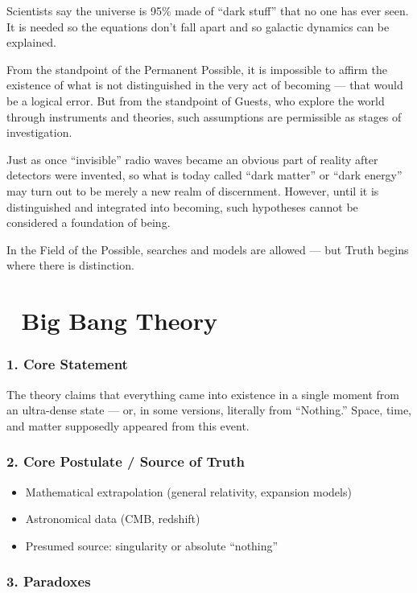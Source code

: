 \documentclass[12pt]{article}
\begin{document}
Scientists say the universe is 95\% made of ``dark stuff'' that no one has ever seen. It is needed so the equations don’t fall apart and so galactic dynamics can be explained.

From the standpoint of the Permanent Possible, it is impossible to affirm the existence of what is not distinguished in the very act of becoming — that would be a logical error. But from the standpoint of Guests, who explore the world through instruments and theories, such assumptions are permissible as stages of investigation.

Just as once ``invisible'' radio waves became an obvious part of reality after detectors were invented, so what is today called ``dark matter'' or ``dark energy'' may turn out to be merely a new realm of discernment. However, until it is distinguished and integrated into becoming, such hypotheses cannot be considered a foundation of being.

In the Field of the Possible, searches and models are allowed — but Truth begins where there is distinction.


\section*{🔷 Big Bang Theory}

\subsubsection*{1. Core Statement}

The theory claims that everything came into existence in a single moment from an ultra-dense state — or, in some versions, literally from ``Nothing.'' Space, time, and matter supposedly appeared from this event.

\subsubsection*{2. Core Postulate / Source of Truth}

\begin{itemize}
\item Mathematical extrapolation (general relativity, expansion models)
\item Astronomical data (CMB, redshift)
\item Presumed source: singularity or absolute ``nothing''
\end{itemize}

\subsubsection*{3. Paradoxes}
\end{document}
